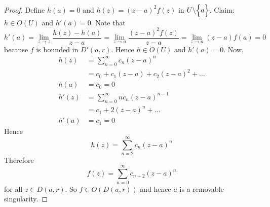 \documentclass[12pt]{article}
\begin{document}
\begin{itemize}
\begin{proof} Define $h(a) = 0$ and $h(z) = (z-a)^2f(z)$ in $U\backslash\Big\{ a \Big\}$. Claim: $h \in O(U)$ and $h'(a) = 0$. Note that $$h'(a) = \lim_{z\to z} \frac{h(z) - h(a)}{z-a} = \lim_{z\to a} \frac{(z-a)^2f(z)}{z-a} = \lim_{z\to a} (z-a)f(a) = 0 $$ because $f$ is bounded in $D'(a,r)$. Hence $h \in O(U)$ and $h'(a) = 0$. Now, $$ \begin{aligned} h(z) &= \sum_{n=0}^\infty c_n(z-a)^n \\ &= c_0 + c_1(z-a) + c_2(z-a)^2 + \dots \\ h(a) &= c_0 = 0 \\ h'(z) &= \sum_{n=0}^\infty nc_n(z-a)^{n-1} \\ &= c_1 + 2(z-a)^n + \dots \\ h'(a) &= c_1 = 0 \end{aligned} $$ Hence $$h(z) = \sum_{n=2}^\infty c_n(z-a)^n $$ Therefore $$f(z) = \sum_{n=0}^\infty c_{n+2}(z-a)^n$$ for all $z \in D(a,r)$. So $f \in O(D(a,r))$ and hence $a$ is a removable singularity. \end{proof} 
\end{itemize}
\end{document}
